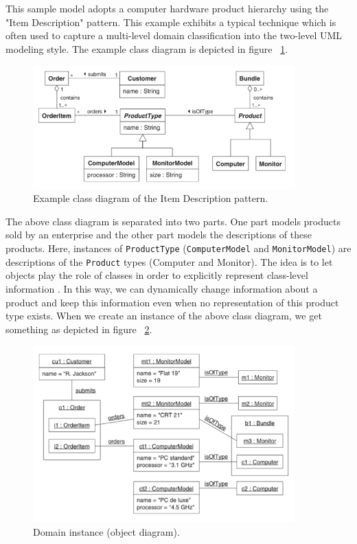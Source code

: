 This sample model adopts a computer hardware product hierarchy using the "Item Description" pattern. This example exhibits a typical technique which is often used to capture a multi-level domain classification into the two-level UML modeling style. The example class diagram is depicted in figure ~\ref{fig:cd_itemdesc}.
\begin{figure}[h!]
\centering
\includegraphics[width=0.9\textwidth]{images/chap2_cd_itemdesc.png}
\caption{Example class diagram of the Item Description pattern.}
\label{fig:cd_itemdesc}
\end{figure}
The above class diagram is separated into two parts. One part models products sold by an enterprise and the other part models the descriptions of these products. Here, instances of \texttt{ProductType} (\texttt{ComputerModel} and \texttt{MonitorModel}) are descriptions of the \texttt{Product} types (Computer and Monitor). The idea is to let objects play the role of classes in order to explicitly represent class-level information \cite{AccidentalComplexity}. In this way, we can dynamically change information about a product and keep this information even when no representation of this product type exists. When we create an instance of the above class diagram, we get something as depicted in figure ~\ref{fig:domain_instance}.
\begin{figure}[h!]
\centering
\includegraphics[width=0.9\textwidth]{images/chap2_domain_instance.png}
\caption{Domain instance (object diagram).}
\label{fig:domain_instance}
\end{figure}
